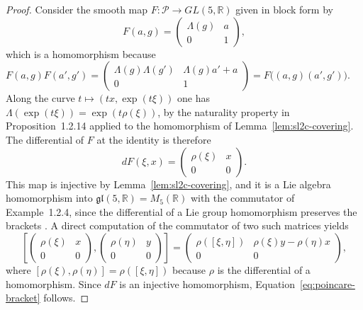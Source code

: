 \begin{proof}
	Consider the smooth map $F:\mathcal{P}\to GL(5,\mathbb{R})$ given in block form by
	\begin{equation*}
		F(a,g)=\begin{pmatrix}\Lambda(g)&a\\0&1\end{pmatrix},
	\end{equation*}
	which is a homomorphism because $F(a,g)F(a',g')=\begin{pmatrix}\Lambda(g)\Lambda(g')&\Lambda(g)a'+a\\0&1\end{pmatrix}=F\big((a,g)(a',g')\big)$. Along the curve $t\mapsto(tx,\exp(t\xi))$ one has $\Lambda(\exp(t\xi))=\exp(t\rho(\xi))$, by the naturality property in Proposition~1.2.14 applied to the homomorphism of Lemma~\ref{lem:sl2c-covering}. The differential of $F$ at the identity is therefore
	\begin{equation*}
		dF(\xi,x)=\begin{pmatrix}\rho(\xi)&x\\0&0\end{pmatrix}.
	\end{equation*}
	This map is injective by Lemma~\ref{lem:sl2c-covering}, and it is a Lie algebra homomorphism into $\mathfrak{gl}(5,\mathbb{R})=M_5(\mathbb{R})$ with the commutator of Example~1.2.4, since the differential of a Lie group homomorphism preserves the brackets \cite[TODO-location]{TODO-Lee13}. A direct computation of the commutator of two such matrices yields
	\begin{equation*}
		\left[\begin{pmatrix}\rho(\xi)&x\\0&0\end{pmatrix},\begin{pmatrix}\rho(\eta)&y\\0&0\end{pmatrix}\right]=\begin{pmatrix}\rho([\xi,\eta])&\rho(\xi)y-\rho(\eta)x\\0&0\end{pmatrix},
	\end{equation*}
	where $[\rho(\xi),\rho(\eta)]=\rho([\xi,\eta])$ because $\rho$ is the differential of a homomorphism. Since $dF$ is an injective homomorphism, Equation~\eqref{eq:poincare-bracket} follows.
	

\end{proof}
